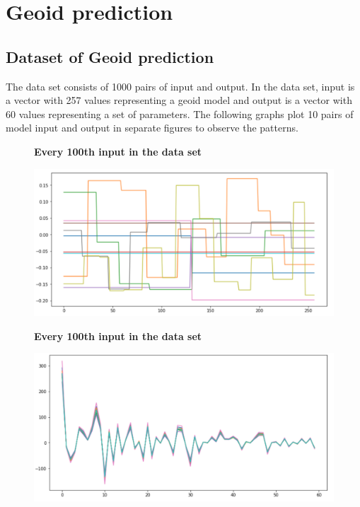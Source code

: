 \chapter{Geoid prediction}\label{chap:content}

\section{Dataset of Geoid prediction}

The data set consists of 1000 pairs of input and output. In the data set, input is a vector with 257 values representing a geoid model and output is a vector with 60 values representing a set of parameters. The following graphs plot 10 pairs of model input and output in separate figures to observe the patterns.

\begin{figure}[H]
    \textbf{Every 100th input in the data set}\par\medskip
    \includegraphics[scale=0.6]{figures/geoid_images/Geoid_sample_input.png}
\end{figure}

\begin{figure}[H]
    \textbf{Every 100th input in the data set}\par\medskip
    \includegraphics[scale=0.6]{figures/geoid_images/Geoid_sample_output.png}
\end{figure}


